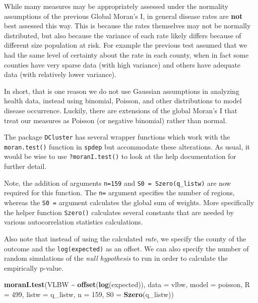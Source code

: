 \documentclass[
]{book}
\newenvironment{Shaded}{\begin{snugshade}}{\end{snugshade}}
\newcommand{\AttributeTok}[1]{\textcolor[rgb]{0.13,0.29,0.53}{#1}}
\newcommand{\DecValTok}[1]{\textcolor[rgb]{0.00,0.00,0.81}{#1}}
\newcommand{\FunctionTok}[1]{\textcolor[rgb]{0.13,0.29,0.53}{\textbf{#1}}}
\newcommand{\NormalTok}[1]{#1}
\newcommand{\SpecialCharTok}[1]{\textcolor[rgb]{0.81,0.36,0.00}{\textbf{#1}}}
\newcommand{\StringTok}[1]{\textcolor[rgb]{0.31,0.60,0.02}{#1}}
\begin{document}
While many measures may be appropriately assessed under the normality assumptions of the previous Global Moran's I, in general disease rates are \textbf{not} best assessed this way. This is because the rates themselves may not be normally distributed, but also because the variance of each rate likely differs because of different size population at risk. For example the previous test assumed that we had the same level of certainty about the rate in each county, when in fact some counties have very sparse data (with high variance) and others have adequate data (with relatively lower variance).

In short, that is one reason we do not use Gaussian assumptions in analyzing health data, instead using binomial, Poisson, and other distributions to model disease occurrence. Luckily, there are extensions of the global Moran's I that treat our measures as Poisson (or negative binomial) rather than normal.

The package \texttt{DCluster} has several wrapper functions which work with the \texttt{moran.test()} function in \texttt{spdep} but accommodate these alterations. As usual, it would be wise to use \texttt{?moranI.test()} to look at the help documentation for further detail.

Note, the addition of arguments \texttt{n=159} and \texttt{S0\ =\ Szero(q\_listw)} are now required for this function. The \texttt{n=} argument specifies the number of regions, whereas the \texttt{S0\ =} argument calculates the global sum of weights. More specifically the helper function \texttt{Szero()} calculates several constants that are needed by various autocorrelation statistics calculations.

Also note that instead of using the calculated \emph{rate}, we specify the county of the outcome and the \texttt{log(expected)} as an offset. We can also specify the number of random simulations of the \emph{null hypothesis} to run in order to calculate the empirically p-value.

\begin{Shaded}
\begin{Highlighting}[]
\FunctionTok{moranI.test}\NormalTok{(VLBW }\SpecialCharTok{\textasciitilde{}} \FunctionTok{offset}\NormalTok{(}\FunctionTok{log}\NormalTok{(expected)), }
                  \AttributeTok{data =}\NormalTok{ vlbw,}
                  \AttributeTok{model =} \StringTok{\textquotesingle{}poisson\textquotesingle{}}\NormalTok{,}
                  \AttributeTok{R =} \DecValTok{499}\NormalTok{,}
                  \AttributeTok{listw =}\NormalTok{ q\_listw,}
                  \AttributeTok{n =} \DecValTok{159}\NormalTok{,}
                  \AttributeTok{S0 =} \FunctionTok{Szero}\NormalTok{(q\_listw))}
\end{Highlighting}
\end{Shaded}
\end{document}
